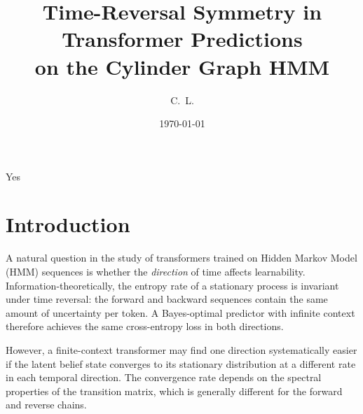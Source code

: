 \documentclass[11pt]{article}
\title{Time-Reversal Symmetry in Transformer Predictions\\
       on the Cylinder Graph HMM}
\author{C.~L.}
\date{\today}
\begin{document}
\maketitle
\tableofcontents
\bigskip
Yes
\section{Introduction}

A natural question in the study of transformers trained on Hidden Markov Model (HMM) sequences is whether the \emph{direction} of time affects learnability.  Information-theoretically, the entropy rate of a stationary process is invariant under time reversal: the forward and backward sequences contain the same amount of uncertainty per token.  A Bayes-optimal predictor with infinite context therefore achieves the same cross-entropy loss in both directions.

However, a finite-context transformer may find one direction systematically easier if the latent belief state converges to its stationary distribution at a different rate in each temporal direction.  The convergence rate depends on the spectral properties of the transition matrix, which is generally different for the forward and reverse chains.
\end{document}
